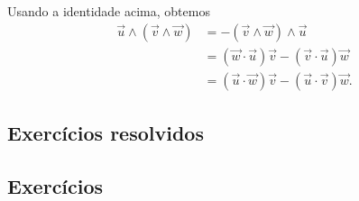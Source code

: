 Usando a identidade acima, obtemos
\begin{align}
  \vec{u}\land(\vec{v}\land\vec{w}) &= -(\vec{v}\land\vec{w})\land\vec{u}\\
                                   &= (\vec{w}\cdot\vec{u})\vec{v}-(\vec{v}\cdot\vec{u})\vec{w}\\
                                   &=(\vec{u}\cdot\vec{w})\vec{v}-(\vec{u}\cdot\vec{v})\vec{w}.
\end{align}

\subsection*{Exercícios resolvidos}

\emconstrucao

\subsection*{Exercícios}

\emconstrucao